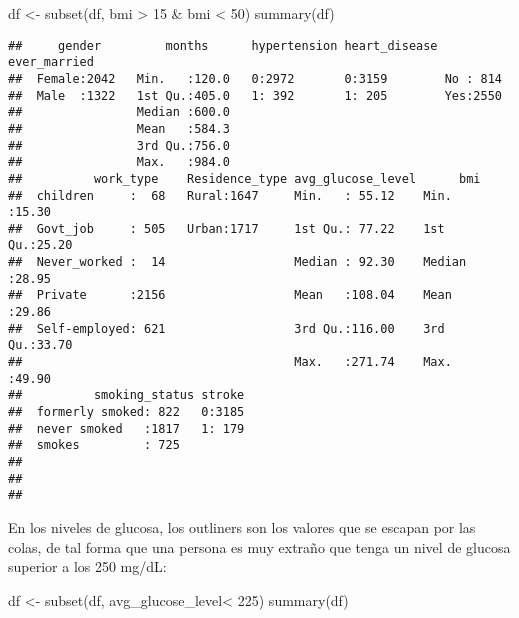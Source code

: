 \documentclass[
]{article}
\newenvironment{Shaded}{\begin{snugshade}}{\end{snugshade}}
\newcommand{\DecValTok}[1]{\textcolor[rgb]{0.00,0.00,0.81}{#1}}
\newcommand{\FunctionTok}[1]{\textcolor[rgb]{0.00,0.00,0.00}{#1}}
\newcommand{\NormalTok}[1]{#1}
\newcommand{\OtherTok}[1]{\textcolor[rgb]{0.56,0.35,0.01}{#1}}
\newcommand{\SpecialCharTok}[1]{\textcolor[rgb]{0.00,0.00,0.00}{#1}}
\begin{document}
\begin{Shaded}
\begin{Highlighting}[]
\NormalTok{df }\OtherTok{\textless{}{-}} \FunctionTok{subset}\NormalTok{(df, bmi }\SpecialCharTok{\textgreater{}} \DecValTok{15} \SpecialCharTok{\&}\NormalTok{ bmi }\SpecialCharTok{\textless{}} \DecValTok{50}\NormalTok{)}
\FunctionTok{summary}\NormalTok{(df)}
\end{Highlighting}
\end{Shaded}

\begin{verbatim}
##     gender         months      hypertension heart_disease ever_married
##  Female:2042   Min.   :120.0   0:2972       0:3159        No : 814    
##  Male  :1322   1st Qu.:405.0   1: 392       1: 205        Yes:2550    
##                Median :600.0                                          
##                Mean   :584.3                                          
##                3rd Qu.:756.0                                          
##                Max.   :984.0                                          
##          work_type    Residence_type avg_glucose_level      bmi       
##  children     :  68   Rural:1647     Min.   : 55.12    Min.   :15.30  
##  Govt_job     : 505   Urban:1717     1st Qu.: 77.22    1st Qu.:25.20  
##  Never_worked :  14                  Median : 92.30    Median :28.95  
##  Private      :2156                  Mean   :108.04    Mean   :29.86  
##  Self-employed: 621                  3rd Qu.:116.00    3rd Qu.:33.70  
##                                      Max.   :271.74    Max.   :49.90  
##          smoking_status stroke  
##  formerly smoked: 822   0:3185  
##  never smoked   :1817   1: 179  
##  smokes         : 725           
##                                 
##                                 
## 
\end{verbatim}

En los niveles de glucosa, los outliners son los valores que se escapan
por las colas, de tal forma que una persona es muy extraño que tenga un
nivel de glucosa superior a los 250 mg/dL:

\begin{Shaded}
\begin{Highlighting}[]
\NormalTok{df }\OtherTok{\textless{}{-}} \FunctionTok{subset}\NormalTok{(df, avg\_glucose\_level}\SpecialCharTok{\textless{}} \DecValTok{225}\NormalTok{)}
\FunctionTok{summary}\NormalTok{(df)}
\end{Highlighting}
\end{Shaded}
\end{document}
